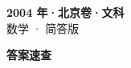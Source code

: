 \documentclass[zihao=-4, a4paper]{ctexart}
\begin{document}
\begin{center}
  {\Large\bfseries 2004 年·北京卷·文科}\\[4pt]
  {\large 数学 · 简答版}
\end{center}
\medskip
{}

\clearpage
{}
\begin{center}{\Large\bfseries 答案速查}\end{center}
\medskip

\end{document}
